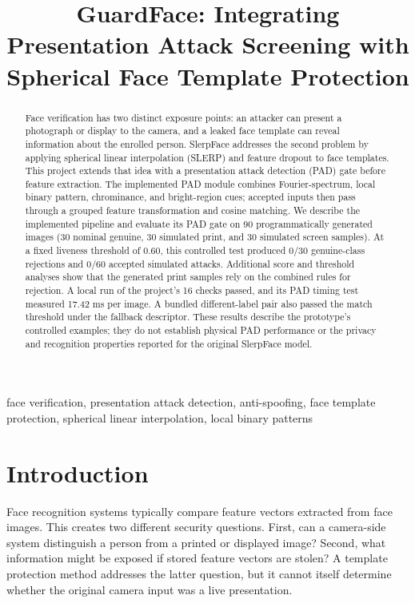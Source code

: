 \documentclass[conference,10pt]{IEEEtran}
\title{GuardFace: Integrating Presentation Attack Screening with Spherical Face Template Protection}
\author{
\IEEEauthorblockN{Divayang Siddhapura (202451154) \quad
Neev Mendapara (202451107) \quad Meet Kapadia (202451105)}
\IEEEauthorblockA{Independent Study Project: Biometric Security and Computer Vision\\
Code: \url{https://github.com/neev-25/SlerpFace_IEEE_Extend}}
}
\begin{document}
\maketitle

\begin{abstract}
Face verification has two distinct exposure points: an attacker can present a photograph or display to the camera, and a leaked face template can reveal information about the enrolled person. SlerpFace addresses the second problem by applying spherical linear interpolation (SLERP) and feature dropout to face templates. This project extends that idea with a presentation attack detection (PAD) gate before feature extraction. The implemented PAD module combines Fourier-spectrum, local binary pattern, chrominance, and bright-region cues; accepted inputs then pass through a grouped feature transformation and cosine matching. We describe the implemented pipeline and evaluate its PAD gate on 90 programmatically generated images (30 nominal genuine, 30 simulated print, and 30 simulated screen samples). At a fixed liveness threshold of 0.60, this controlled test produced 0/30 genuine-class rejections and 0/60 accepted simulated attacks. Additional score and threshold analyses show that the generated print samples rely on the combined rules for rejection. A local run of the project's 16 checks passed, and its PAD timing test measured 17.42 ms per image. A bundled different-label pair also passed the match threshold under the fallback descriptor. These results describe the prototype's controlled examples; they do not establish physical PAD performance or the privacy and recognition properties reported for the original SlerpFace model.
\end{abstract}

\begin{IEEEkeywords}
face verification, presentation attack detection, anti-spoofing, face template protection, spherical linear interpolation, local binary patterns
\end{IEEEkeywords}

\section{Introduction}
Face recognition systems typically compare feature vectors extracted from face images. This creates two different security questions. First, can a camera-side system distinguish a person from a printed or displayed image? Second, what information might be exposed if stored feature vectors are stolen? A template protection method addresses the latter question, but it cannot itself determine whether the original camera input was a live presentation.
\end{document}
